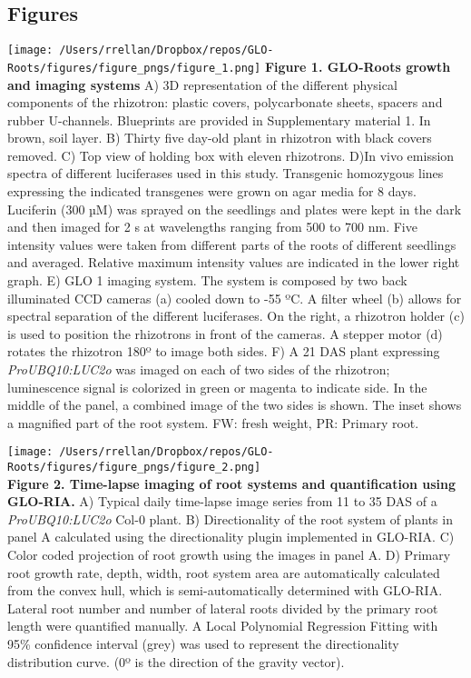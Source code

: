 \documentclass[]{article}
\begin{document}
\pagebreak

\subsection{Figures}\label{figures}

\texttt{[image: /Users/rrellan/Dropbox/repos/GLO-Roots/figures/figure\_pngs/figure\_1.png]}
\textbf{Figure 1. GLO-Roots growth and imaging systems} A) 3D
representation of the different physical components of the rhizotron:
plastic covers, polycarbonate sheets, spacers and rubber U-channels.
Blueprints are provided in Supplementary material 1. In brown, soil
layer. B) Thirty five day-old plant in rhizotron with black covers
removed. C) Top view of holding box with eleven rhizotrons. D)In vivo
emission spectra of different luciferases used in this study. Transgenic
homozygous lines expressing the indicated transgenes were grown on agar
media for 8 days. Luciferin (300 µM) was sprayed on the seedlings and
plates were kept in the dark and then imaged for 2 s at wavelengths
ranging from 500 to 700 nm. Five intensity values were taken from
different parts of the roots of different seedlings and averaged.
Relative maximum intensity values are indicated in the lower right
graph. E) GLO 1 imaging system. The system is composed by two back
illuminated CCD cameras (a) cooled down to -55 ºC. A filter wheel (b)
allows for spectral separation of the different luciferases. On the
right, a rhizotron holder (c) is used to position the rhizotrons in
front of the cameras. A stepper motor (d) rotates the rhizotron 180º to
image both sides. F) A 21 DAS plant expressing \emph{ProUBQ10:LUC2o} was
imaged on each of two sides of the rhizotron; luminescence signal is
colorized in green or magenta to indicate side. In the middle of the
panel, a combined image of the two sides is shown. The inset shows a
magnified part of the root system. FW: fresh weight, PR: Primary root.

\pagebreak

\texttt{[image: /Users/rrellan/Dropbox/repos/GLO-Roots/figures/figure\_pngs/figure\_2.png]}\\\textbf{Figure
2. Time-lapse imaging of root systems and quantification using GLO-RIA.}
A) Typical daily time-lapse image series from 11 to 35 DAS of a
\emph{ProUBQ10:LUC2o} Col-0 plant. B) Directionality of the root system
of plants in panel A calculated using the directionality plugin
implemented in GLO-RIA. C) Color coded projection of root growth using
the images in panel A. D) Primary root growth rate, depth, width, root
system area are automatically calculated from the convex hull, which is
semi-automatically determined with GLO-RIA. Lateral root number and
number of lateral roots divided by the primary root length were
quantified manually. A Local Polynomial Regression Fitting with 95\%
confidence interval (grey) was used to represent the directionality
distribution curve. (0º is the direction of the gravity vector).
\end{document}
